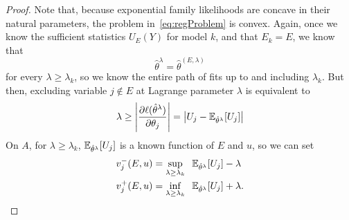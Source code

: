 \documentclass{article}
\begin{document}
\begin{proof}
  Note that, because exponential family likelihoods are concave in their natural parameters, the problem in~\eqref{eq:regProblem} is convex. Again, once we know the sufficient statistics $U_E(Y)$ for model $k$, and that $E_k=E$, we know that
  \[
  \hat\theta^\lambda = \hat\theta^{(E,\lambda)}
  \]
  for every $\lambda \geq \lambda_k$, so we know the entire path of fits up to and including $\lambda_k$. But then, excluding variable $j \notin E$ at Lagrange parameter $\lambda$ is equivalent to
  \[
  \lambda \geq 
  \left| \frac{\partial \ell(\hat\theta^\lambda)}{\partial \theta_j} \right|
  = \left|U_j - \mathbb{E}_{\hat\theta^\lambda}[U_j]\right|
  \]
  On $A$, for $\lambda \geq\lambda_k$, 
  $\mathbb{E}_{\hat\theta^\lambda}[U_j]$ is a known function of $E$ and $u$,
  so we can set
  \begin{align}\label{eq:vMinus_L1}
    v_j^-(E,u) &= \sup_{\lambda \geq \lambda_k} \;\; 
    \mathbb{E}_{\hat\theta^\lambda}[U_j] - \lambda \\
    \label{eq:vPlus_L1}
    v_j^+(E,u) &= \inf_{\lambda \geq \lambda_k} \;\;
    \mathbb{E}_{\hat\theta^\lambda}[U_j] + \lambda .
  \end{align}
\end{proof}
\end{document}
